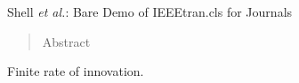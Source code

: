 \documentclass[journal]{IEEEtran}
\begin{document}
%
{Shell \MakeLowercase{\textit{et al.}}: Bare Demo of IEEEtran.cls for Journals}
% 











\maketitle


\begin{abstract}
Abstract
\end{abstract}

\begin{IEEEkeywords}
Finite rate of innovation.
\end{IEEEkeywords}






%
\IEEEpeerreviewmaketitle
\end{document}
